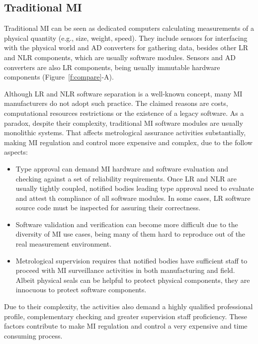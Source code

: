 \documentclass[journal]{IEEEtran} %
\begin{document}
\subsection{Traditional MI}
\label{s:mi_traditional}
Traditional MI can be seen as dedicated computers calculating measurements of a physical quantity (e.g., size, weight, speed). They include sensors for interfacing with the physical world and AD converters for gathering data, besides other LR and NLR components, which are usually software modules. Sensors and AD converters are also LR components, being usually immutable hardware components (Figure~\ref{f:compare}-A).

Although LR and NLR software separation is a well-known concept, many MI manufacturers do not adopt such practice. The claimed reasons are costs, computational resources restrictions or the existence of a legacy software. As a paradox, despite their complexity, traditional MI software modules are usually monolithic systems. That affects metrological assurance activities substantially, making MI regulation and control more expensive and complex, due to the follow aspects:
 \begin{itemize} 
\item Type approval can demand MI hardware and software evaluation and checking against a set of reliability requirements. Once LR and NLR are usually tightly coupled, notified bodies leading type approval need to evaluate and attest th compliance of all software modules. In some cases, LR software source code must be inspected for assuring their correctness.
\item Software validation and verification can become more difficult due to the diversity of MI use cases, being many of them hard to reproduce out of the real measurement environment. 
\item Metrological supervision requires that notified bodies have sufficient staff to proceed with MI surveillance activities in both manufacturing and field. Albeit physical seals can be helpful to protect physical components, they are innocuous to protect software components.
 \end{itemize} 

Due to their complexity, the activities also demand a highly qualified professional profile, complementary checking and greater supervision staff proficiency. These factors contribute to make MI regulation and control a very expensive and time consuming process.
\end{document}

